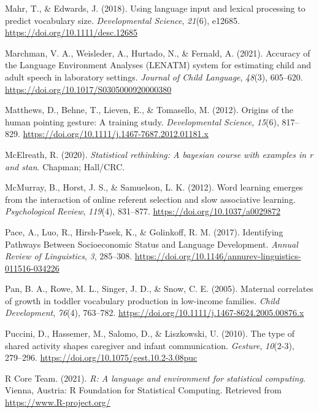 \documentclass[
  english,
  man,floatsintext]{apa6}
\begin{document}
\leavevmode\hypertarget{ref-mahr_using_2018}{}%
Mahr, T., \& Edwards, J. (2018). Using language input and lexical processing to predict vocabulary size. \emph{Developmental Science}, \emph{21}(6), e12685. \url{https://doi.org/10.1111/desc.12685}

\leavevmode\hypertarget{ref-marchman_accuracy_2021}{}%
Marchman, V. A., Weisleder, A., Hurtado, N., \& Fernald, A. (2021). Accuracy of the Language Environment Analyses (LENATM) system for estimating child and adult speech in laboratory settings. \emph{Journal of Child Language}, \emph{48}(3), 605--620. \url{https://doi.org/10.1017/S0305000920000380}

\leavevmode\hypertarget{ref-matthews_origins_2012}{}%
Matthews, D., Behne, T., Lieven, E., \& Tomasello, M. (2012). Origins of the human pointing gesture: A training study. \emph{Developmental Science}, \emph{15}(6), 817--829. \url{https://doi.org/10.1111/j.1467-7687.2012.01181.x}

\leavevmode\hypertarget{ref-mcelreath2020statistical}{}%
McElreath, R. (2020). \emph{Statistical rethinking: A bayesian course with examples in r and stan}. Chapman; Hall/CRC.

\leavevmode\hypertarget{ref-mcmurray_word_2012}{}%
McMurray, B., Horst, J. S., \& Samuelson, L. K. (2012). Word learning emerges from the interaction of online referent selection and slow associative learning. \emph{Psychological Review}, \emph{119}(4), 831--877. \url{https://doi.org/10.1037/a0029872}

\leavevmode\hypertarget{ref-pace_identifying_2017}{}%
Pace, A., Luo, R., Hirsh-Pasek, K., \& Golinkoff, R. M. (2017). Identifying Pathways Between Socioeconomic Status and Language Development. \emph{Annual Review of Linguistics}, \emph{3}, 285--308. \url{https://doi.org/10.1146/annurev-linguistics-011516-034226}

\leavevmode\hypertarget{ref-pan_maternal_2005}{}%
Pan, B. A., Rowe, M. L., Singer, J. D., \& Snow, C. E. (2005). Maternal correlates of growth in toddler vocabulary production in low-income families. \emph{Child Development}, \emph{76}(4), 763--782. \url{https://doi.org/10.1111/j.1467-8624.2005.00876.x}

\leavevmode\hypertarget{ref-puccini_type_2010}{}%
Puccini, D., Hassemer, M., Salomo, D., \& Liszkowski, U. (2010). The type of shared activity shapes caregiver and infant communication. \emph{Gesture}, \emph{10}(2-3), 279--296. \url{https://doi.org/10.1075/gest.10.2-3.08puc}

\leavevmode\hypertarget{ref-citeR}{}%
R Core Team. (2021). \emph{R: A language and environment for statistical computing}. Vienna, Austria: R Foundation for Statistical Computing. Retrieved from \url{https://www.R-project.org/}
\end{document}
